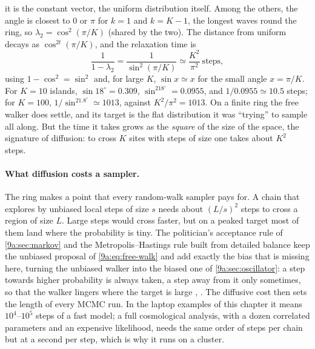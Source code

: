 it is the constant vector, the uniform distribution itself. Among the others, the angle is
closest to $0$ or $\pi$ for $k=1$ and $k=K-1$, the longest waves round the ring, so
$\lambda_2=\cos^2(\pi/K)$ (shared by the two). The distance from uniform decays as
$\cos^{2t}(\pi/K)$, and the relaxation time is
\begin{equation*}
  \frac1{1-\lambda_2}=\frac1{\sin^2(\pi/K)}\simeq\frac{K^2}{\pi^2}\ \text{steps},
\end{equation*}
using $1-\cos^2=\sin^2$ and, for large $K$, $\sin x\simeq x$ for the small angle $x=\pi/K$. For
$K=10$ islands, $\sin18^\circ=0.309$, $\sin^218^\circ=0.0955$, and $1/0.0955\simeq10.5$
steps; for $K=100$, $1/\sin^21.8^\circ\simeq1013$, against $K^2/\pi^2=1013$. On a finite ring the free
walker does settle, and its target is the flat distribution it was ``trying'' to sample all along.
But the time it takes grows as the \emph{square} of the size of the space, the signature of
diffusion: to cross $K$ sites with steps of size one takes about $K^2$ steps.

\paragraph{What diffusion costs a sampler.}
The ring makes a point that every random-walk sampler pays for. A chain that explores by
unbiased local steps of size $s$ needs about $(L/s)^2$ steps to cross a region of size $L$. Large
steps would cross faster, but on a peaked target most of them land where the probability is tiny.
The politician's acceptance rule of \cref{9a:sec:markov} and the Metropolis--Hastings rule built
from detailed balance keep the unbiased proposal of \eqref{9a:eq:free-walk} and add exactly the
bias that is missing here, turning the unbiased walker into the biased one of
\cref{9a:sec:oscillator}: a step towards higher probability is always taken, a step away from it
only sometimes, so that the walker lingers where the target is large
, . The diffusive cost then sets the length of every
MCMC run. In the laptop examples of this chapter it means $10^4$--$10^5$ steps of a fast model; a
full cosmological analysis, with a dozen correlated parameters and an expensive likelihood, needs
the same order of steps per chain but at a second per step, which is why it runs on a cluster.

